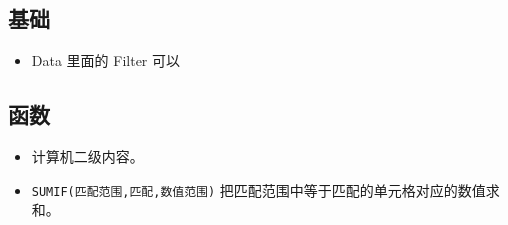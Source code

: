 
\begin{issues}
\issueDraft
\end{issues}

\subsection{基础}
\begin{itemize}
\item Data 里面的 Filter 可以
\end{itemize}


\subsection{函数}
\begin{itemize}
\item 计算机二级内容。
\item \verb|SUMIF(匹配范围,匹配,数值范围)| 把匹配范围中等于匹配的单元格对应的数值求和。
\end{itemize}
